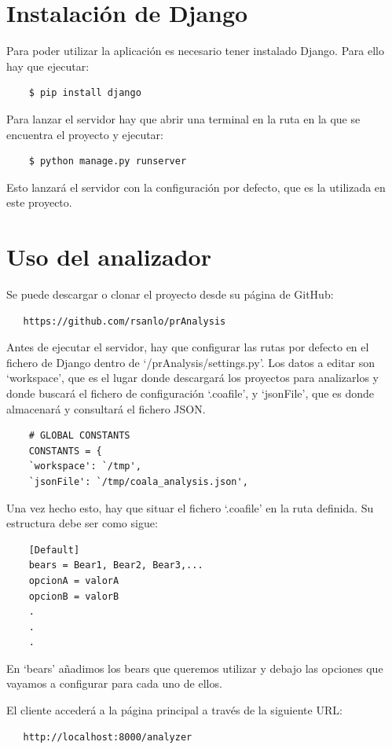\documentclass[a4paper, 12pt]{book}
\begin{document}
\section{Instalación de Django}
\label{app:inst_Django}
Para poder utilizar la aplicación es necesario tener instalado Django. Para ello hay que ejecutar:
{\footnotesize
\begin{verbatim}
    $ pip install django
\end{verbatim}
}

Para lanzar el servidor hay que abrir una terminal en la ruta en la que se encuentra el proyecto y ejecutar:
{\footnotesize
\begin{verbatim}
    $ python manage.py runserver
\end{verbatim}
}
Esto lanzará el servidor con la configuración por defecto, que es la utilizada en este proyecto.

\section{Uso del analizador}
\label{app:analyzer}
Se puede descargar o clonar el proyecto desde su página de GitHub:
{\footnotesize
\begin{verbatim}
   https://github.com/rsanlo/prAnalysis
\end{verbatim}
}

Antes de ejecutar el servidor, hay que configurar las rutas por defecto en el fichero de Django dentro de `/prAnalysis/settings.py'. Los datos a editar son `workspace', que es el lugar donde descargará los proyectos para analizarlos y donde buscará el fichero de configuración `.coafile', y `jsonFile', que es donde almacenará y consultará el fichero JSON.
{\footnotesize
\begin{verbatim}
    # GLOBAL CONSTANTS
    CONSTANTS = {
    `workspace': `/tmp',
    `jsonFile': `/tmp/coala_analysis.json',
\end{verbatim}
}
Una vez hecho esto, hay que situar el fichero `.coafile' en la ruta definida. Su estructura debe ser como sigue:
{\footnotesize
\begin{verbatim}
    [Default]
    bears = Bear1, Bear2, Bear3,...
    opcionA = valorA
    opcionB = valorB
    .
    .
    .
\end{verbatim}
}

En `bears' añadimos los bears que queremos utilizar y debajo las opciones que vayamos a configurar para cada uno de ellos.

El cliente accederá a la página principal a través de la siguiente URL:
{\footnotesize
\begin{verbatim}
   http://localhost:8000/analyzer
\end{verbatim}
}
\end{document}
